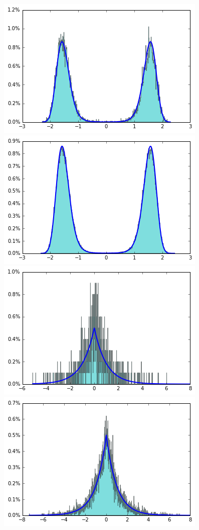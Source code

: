 \documentclass[final]{beamer}
\newlength{\onecolwid}
\begin{document}
\begin{frame}[t]
\begin{columns}[t]
\begin{column}{\onecolwid}
\begin{figure}
    \includegraphics[width=.3\onecolwid]{../figure/case2_step_0.005_iter_1e4.png}
    \includegraphics[width=.3\onecolwid]{../figure/case2_step_0.005_iter_1e5.png}\\
    \includegraphics[width=.3\onecolwid]{../figure/case3_step_0.005_iter_1e3.png}
    \includegraphics[width=.3\onecolwid]{../figure/case3_step_0.005_iter_1e4.png}

\end{figure}
\end{column}
\end{columns}
\end{frame}
\end{document}

